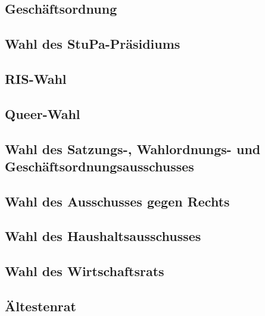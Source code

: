 \documentclass[ngerman,headheight=70pt]{scrartcl}
\begin{document}
    \subsection{Geschäftsordnung}

    \subsection{Wahl des StuPa-Präsidiums}

    \subsection{RIS-Wahl}

    \subsection{Queer-Wahl}

    \subsection{Wahl des Satzungs-, Wahlordnungs- und Geschäftsordnungsausschusses}

    \subsection{Wahl des Ausschusses gegen Rechts}

    \subsection{Wahl des Haushaltsausschusses}

    \subsection{Wahl des Wirtschaftsrats}

    \subsection{Ältestenrat}
\end{document}
